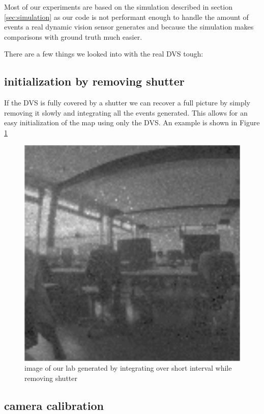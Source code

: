 Most of our experiments are based on the simulation described in section
\ref{sec:simulation} as our code is not performant enough to handle the amount
of events a real dynamic vision sensor generates and because the simulation
makes comparisons with ground truth much easier.

There are a few things we looked into with the real DVS tough:

\subsection{initialization by removing shutter}

If the DVS is fully covered by a shutter we can recover a full picture by
simply removing it slowly and integrating all the events generated. This allows
for an easy initialization of the map using only the DVS. An example is shown in Figure \ref{fig:shutter_integration}

\begin{figure}
\includegraphics[width=\linewidth]{images/PCLab_integrated.png}
\caption{image of our lab generated by integrating over short interval while removing shutter}
\label{fig:shutter_integration}
\end{figure}


\subsection{camera calibration}

